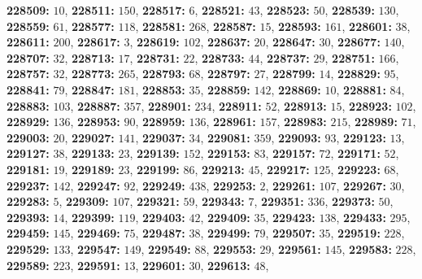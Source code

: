 \textsf{\bfseries 228509:} $10$, \textsf{\bfseries 228511:} $150$, \textsf{\bfseries 228517:} $6$, \textsf{\bfseries 228521:} $43$, \textsf{\bfseries 228523:} $50$, \textsf{\bfseries 228539:} $130$, \textsf{\bfseries 228559:} $61$, \textsf{\bfseries 228577:} $118$, \textsf{\bfseries 228581:} $268$, \textsf{\bfseries 228587:} $15$, \textsf{\bfseries 228593:} $161$, \textsf{\bfseries 228601:} $38$, \textsf{\bfseries 228611:} $200$, \textsf{\bfseries 228617:} $3$, \textsf{\bfseries 228619:} $102$, \textsf{\bfseries 228637:} $20$, \textsf{\bfseries 228647:} $30$, \textsf{\bfseries 228677:} $140$, \textsf{\bfseries 228707:} $32$, \textsf{\bfseries 228713:} $17$, \textsf{\bfseries 228731:} $22$, \textsf{\bfseries 228733:} $44$, \textsf{\bfseries 228737:} $29$, \textsf{\bfseries 228751:} $166$, \textsf{\bfseries 228757:} $32$, \textsf{\bfseries 228773:} $265$, \textsf{\bfseries 228793:} $68$, \textsf{\bfseries 228797:} $27$, \textsf{\bfseries 228799:} $14$, \textsf{\bfseries 228829:} $95$, \textsf{\bfseries 228841:} $79$, \textsf{\bfseries 228847:} $181$, \textsf{\bfseries 228853:} $35$, \textsf{\bfseries 228859:} $142$, \textsf{\bfseries 228869:} $10$, \textsf{\bfseries 228881:} $84$, \textsf{\bfseries 228883:} $103$, \textsf{\bfseries 228887:} $357$, \textsf{\bfseries 228901:} $234$, \textsf{\bfseries 228911:} $52$, \textsf{\bfseries 228913:} $15$, \textsf{\bfseries 228923:} $102$, \textsf{\bfseries 228929:} $136$, \textsf{\bfseries 228953:} $90$, \textsf{\bfseries 228959:} $136$, \textsf{\bfseries 228961:} $157$, \textsf{\bfseries 228983:} $215$, \textsf{\bfseries 228989:} $71$, \textsf{\bfseries 229003:} $20$, \textsf{\bfseries 229027:} $141$, \textsf{\bfseries 229037:} $34$, \textsf{\bfseries 229081:} $359$, \textsf{\bfseries 229093:} $93$, \textsf{\bfseries 229123:} $13$, \textsf{\bfseries 229127:} $38$, \textsf{\bfseries 229133:} $23$, \textsf{\bfseries 229139:} $152$, \textsf{\bfseries 229153:} $83$, \textsf{\bfseries 229157:} $72$, \textsf{\bfseries 229171:} $52$, \textsf{\bfseries 229181:} $19$, \textsf{\bfseries 229189:} $23$, \textsf{\bfseries 229199:} $86$, \textsf{\bfseries 229213:} $45$, \textsf{\bfseries 229217:} $125$, \textsf{\bfseries 229223:} $68$, \textsf{\bfseries 229237:} $142$, \textsf{\bfseries 229247:} $92$, \textsf{\bfseries 229249:} $438$, \textsf{\bfseries 229253:} $2$, \textsf{\bfseries 229261:} $107$, \textsf{\bfseries 229267:} $30$, \textsf{\bfseries 229283:} $5$, \textsf{\bfseries 229309:} $107$, \textsf{\bfseries 229321:} $59$, \textsf{\bfseries 229343:} $7$, \textsf{\bfseries 229351:} $336$, \textsf{\bfseries 229373:} $50$, \textsf{\bfseries 229393:} $14$, \textsf{\bfseries 229399:} $119$, \textsf{\bfseries 229403:} $42$, \textsf{\bfseries 229409:} $35$, \textsf{\bfseries 229423:} $138$, \textsf{\bfseries 229433:} $295$, \textsf{\bfseries 229459:} $145$, \textsf{\bfseries 229469:} $75$, \textsf{\bfseries 229487:} $38$, \textsf{\bfseries 229499:} $79$, \textsf{\bfseries 229507:} $35$, \textsf{\bfseries 229519:} $228$, \textsf{\bfseries 229529:} $133$, \textsf{\bfseries 229547:} $149$, \textsf{\bfseries 229549:} $88$, \textsf{\bfseries 229553:} $29$, \textsf{\bfseries 229561:} $145$, \textsf{\bfseries 229583:} $228$, \textsf{\bfseries 229589:} $223$, \textsf{\bfseries 229591:} $13$, \textsf{\bfseries 229601:} $30$, \textsf{\bfseries 229613:} $48$, 
